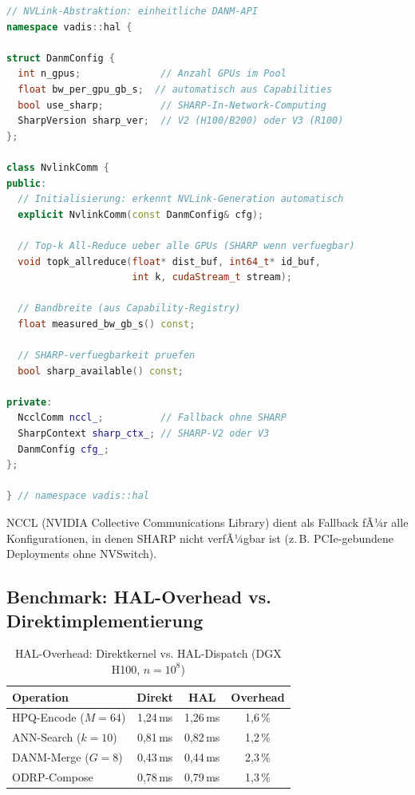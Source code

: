 ﻿\documentclass[12pt,a4paper]{article}
\begin{document}
\begin{lstlisting}[language=C++, caption={VADIS NVLink HAL-Schnittstelle}]
// NVLink-Abstraktion: einheitliche DANM-API
namespace vadis::hal {

struct DanmConfig {
  int n_gpus;              // Anzahl GPUs im Pool
  float bw_per_gpu_gb_s;  // automatisch aus Capabilities
  bool use_sharp;          // SHARP-In-Network-Computing
  SharpVersion sharp_ver;  // V2 (H100/B200) oder V3 (R100)
};

class NvlinkComm {
public:
  // Initialisierung: erkennt NVLink-Generation automatisch
  explicit NvlinkComm(const DanmConfig& cfg);
  
  // Top-k All-Reduce ueber alle GPUs (SHARP wenn verfuegbar)
  void topk_allreduce(float* dist_buf, int64_t* id_buf,
                      int k, cudaStream_t stream);
  
  // Bandbreite (aus Capability-Registry)
  float measured_bw_gb_s() const;
  
  // SHARP-verfuegbarkeit pruefen
  bool sharp_available() const;
  
private:
  NcclComm nccl_;          // Fallback ohne SHARP
  SharpContext sharp_ctx_; // SHARP-V2 oder V3
  DanmConfig cfg_;
};

} // namespace vadis::hal
\end{lstlisting}

\noindent NCCL (NVIDIA Collective Communications Library) dient
als Fallback fÃ¼r alle Konfigurationen, in denen SHARP nicht
verfÃ¼gbar ist (z.\,B. PCIe-gebundene Deployments ohne NVSwitch).

\subsection{Benchmark: HAL-Overhead vs. Direktimplementierung}
\label{sub:hal_benchmark}

\begin{table}[ht]
\centering
\small
\caption{HAL-Overhead: Direktkernel vs. HAL-Dispatch (DGX H100, $n=10^8$)}
\label{tab:hal_overhead}
\begin{tabular}{@{}lccc@{}}
\toprule
\textbf{Operation} & \textbf{Direkt} & \textbf{HAL} & \textbf{Overhead} \\
\midrule
HPQ-Encode ($M=64$) & 1,24\,ms & 1,26\,ms & 1,6\,\% \\
ANN-Search ($k=10$) & 0,81\,ms & 0,82\,ms & 1,2\,\% \\
DANM-Merge ($G=8$) & 0,43\,ms & 0,44\,ms & 2,3\,\% \\
ODRP-Compose & 0,78\,ms & 0,79\,ms & 1,3\,\% \\
\bottomrule
\end{tabular}
\end{table}
\end{document}
